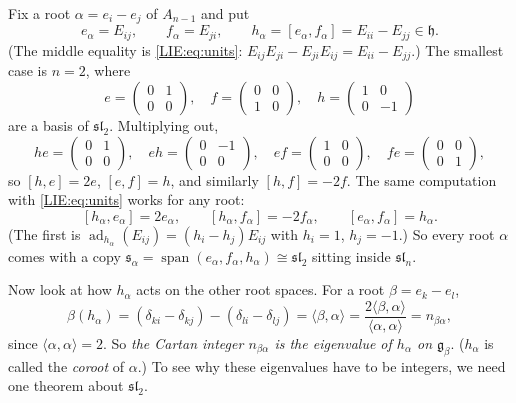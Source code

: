 \documentclass[11pt,openany]{book}
\theoremstyle{plain}
\theoremstyle{definition}
\theoremstyle{remark}
\newcommand{\ip}[2]{\langle #1, #2\rangle}
\begin{document}
Fix a root $\alpha=e_i-e_j$ of $A_{n-1}$ and put
\[
  e_\alpha=E_{ij},\qquad f_\alpha=E_{ji},\qquad h_\alpha=[e_\alpha,f_\alpha]=E_{ii}-E_{jj}\in\mathfrak h.
\]
(The middle equality is \eqref{LIE:eq:units}: $E_{ij}E_{ji}-E_{ji}E_{ij}=E_{ii}-E_{jj}$.) The smallest
case is $n=2$, where
\[
  e=\begin{pmatrix}0&1\\0&0\end{pmatrix},\quad
  f=\begin{pmatrix}0&0\\1&0\end{pmatrix},\quad
  h=\begin{pmatrix}1&0\\0&-1\end{pmatrix}
\]
are a basis of $\mathfrak{sl}_2$. Multiplying out,
\[
  he=\begin{pmatrix}0&1\\0&0\end{pmatrix},\quad eh=\begin{pmatrix}0&-1\\0&0\end{pmatrix},\quad
  ef=\begin{pmatrix}1&0\\0&0\end{pmatrix},\quad fe=\begin{pmatrix}0&0\\0&1\end{pmatrix},
\]
so $[h,e]=2e$, $[e,f]=h$, and similarly $[h,f]=-2f$. The same computation with
\eqref{LIE:eq:units} works for any root:
\begin{equation}\label{LIE:eq:sl2rel}
  [h_\alpha,e_\alpha]=2e_\alpha,\qquad [h_\alpha,f_\alpha]=-2f_\alpha,\qquad [e_\alpha,f_\alpha]=h_\alpha .
\end{equation}
(The first is $\operatorname{ad}_{h_\alpha}(E_{ij})=(h_i-h_j)E_{ij}$ with $h_i=1$, $h_j=-1$.) So every root $\alpha$ comes with a copy
$\mathfrak s_\alpha=\operatorname{span}(e_\alpha,f_\alpha,h_\alpha)\cong\mathfrak{sl}_2$ sitting inside $\mathfrak{sl}_n$.

Now look at how $h_\alpha$ acts on the other root spaces. For a root $\beta=e_k-e_l$,
\[
  \beta(h_\alpha)=(\delta_{ki}-\delta_{kj})-(\delta_{li}-\delta_{lj})=\ip{\beta}{\alpha}
  =\frac{2\ip{\beta}{\alpha}}{\ip{\alpha}{\alpha}}=n_{\beta\alpha},
\]
since $\ip{\alpha}{\alpha}=2$. So \emph{the Cartan integer $n_{\beta\alpha}$ is the eigenvalue of
$h_\alpha$ on $\mathfrak g_\beta$}. ($h_\alpha$ is called the \emph{coroot} of $\alpha$.) To see why these
eigenvalues have to be integers, we need one theorem about $\mathfrak{sl}_2$.
\end{document}
